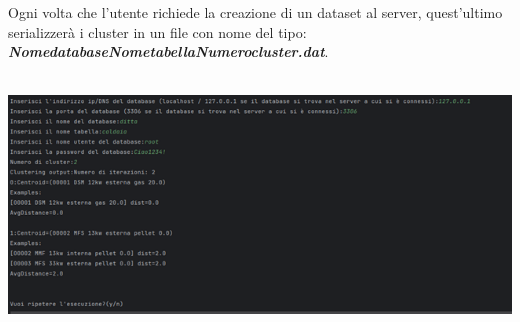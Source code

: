 \begin{enumerate}
\begin{itemize}[label=-]
    Ogni volta che l'utente richiede la creazione di un dataset al server, quest'ultimo serializzerà i cluster in un file con nome del tipo: \textbf{\textit{NomedatabaseNometabellaNumerocluster.dat}}. \\ \\
    \begin{minipage}[t]{0.3\textwidth}
      \includegraphics[scale=0.8]{img/test14.png}
    \end{minipage}
  \end{itemize}
\end{enumerate}

